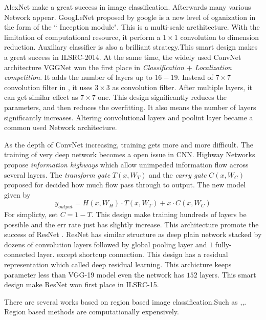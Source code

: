 \documentclass[10pt,twocolumn,letterpaper]{article}
\begin{document}
\par
AlexNet make a great success in image classification. Afterwards many various Network appear. GoogLeNet\cite{szegedy2015going} proposed by google is a new level of oganization in the form of the `` Inception module". This is a multi-scale arcthitecture. With the limitation of computational resource, it perform a $1\times 1 $ convolution to dimension reduction. Auxiliary classifier is also a brilliant strategy.This smart design makes a great success in ILSRC-2014. At the same time, the widely used ConvNet architecture VGGNet\cite{simonyan2014very}  won the first place in \textit{Classification $+$ Localization competition}. It adds the number of layers up to $16-19$. Instead of $7\times 7$ convolution filter in \cite{simonyan2014very}, it uses $3\times 3$ as convolution filter. After multiple layers, it can get similar effect as $7\times 7 $ one. This design significantly reduces the parameters, and then reduces the overfitting. It also means the number of layers significantly increases. Altering convolutional layers and poolint layer became a common used Network architecture.
\par
As the depth of ConvNet increasing, training gets more and more difficult. The training of very deep network becomes a open issue in CNN. Highway Networks\cite{srivastava2015highway, srivastava2015training} propose \textit{information highways} which allow unimpeded information flow across several layers. The \textit{transform gate} $T(x, W_{T})$ and the \textit{carry gate} $C(x, W_{C})$ proposed for decided how much flow pass through to output. The new model given by
\begin{equation}
  y_{output} = H(x, W_{H})\cdot T(x, W_{T}) + x\cdot C(x, W_{C})
\end{equation}
For simplicty, \cite{he2016deep} set $C = 1 - T$. This design make training hundreds of layers be possible and the err rate just has slightly increase. This architecture promote the success of ResNet \cite{he2016deep}. ResNet has similar structure as deep plain network stacked by dozens of convolution layers followed by global pooling layer and $1$ fully-connected layer. except shortcup connection. This design has a residual representation which called deep residual learning. This archicture keeps parameter less than VGG-19 model even the network has $152$ layers. This smart design make ResNet won first place in ILSRC-15.

There are several works based on region based image classification.Such as \cite{girshick2015fast},\cite{DSDFGVFB}\cite{uijlings2013selective},\cite{alexe2012measuring}. Region based methods are computationally expensively.
\end{document}
